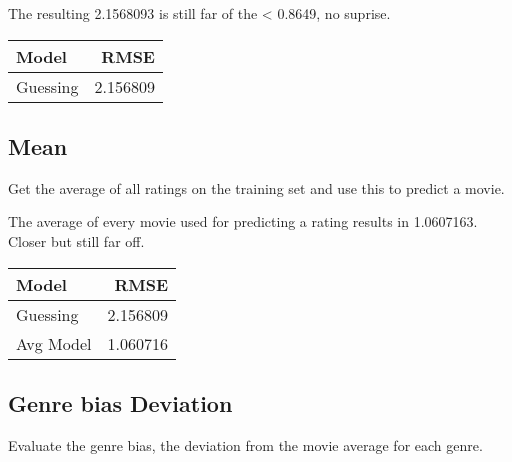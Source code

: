 \documentclass[
]{article}
\newenvironment{Shaded}{\begin{snugshade}}{\end{snugshade}}
\newcommand{\AttributeTok}[1]{\textcolor[rgb]{0.13,0.29,0.53}{#1}}
\newcommand{\CommentTok}[1]{\textcolor[rgb]{0.56,0.35,0.01}{\textit{#1}}}
\newcommand{\FunctionTok}[1]{\textcolor[rgb]{0.13,0.29,0.53}{\textbf{#1}}}
\newcommand{\NormalTok}[1]{#1}
\newcommand{\OtherTok}[1]{\textcolor[rgb]{0.56,0.35,0.01}{#1}}
\newcommand{\SpecialCharTok}[1]{\textcolor[rgb]{0.81,0.36,0.00}{\textbf{#1}}}
\newcommand{\StringTok}[1]{\textcolor[rgb]{0.31,0.60,0.02}{#1}}
\begin{document}
The resulting 2.1568093 is still far of the \textless{} 0.8649, no
suprise.

\begin{tabular}{l|r}
\hline
Model & RMSE\\
\hline
Guessing & 2.156809\\
\hline
\end{tabular}

\hypertarget{mean}{%
\subsection{Mean}\label{mean}}

Get the average of all ratings on the training set and use this to
predict a movie.

\begin{Shaded}
\end{Shaded}

The average of every movie used for predicting a rating results in
1.0607163. Closer but still far off.

\begin{tabular}{l|r}
\hline
Model & RMSE\\
\hline
Guessing & 2.156809\\
\hline
Avg Model & 1.060716\\
\hline
\end{tabular}

\hypertarget{genre-bias-deviation}{%
\subsection{Genre bias Deviation}\label{genre-bias-deviation}}

Evaluate the genre bias, the deviation from the movie average for each
genre.

\begin{Shaded}
\end{Shaded}
\end{document}
